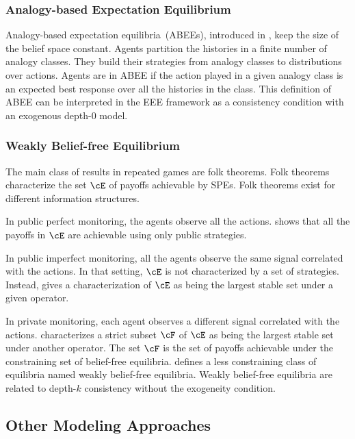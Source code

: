 \subsubsection{Analogy-based Expectation Equilibrium}
Analogy-based expectation equilibria~(ABEEs), introduced in \cite{jehiel:2005}, keep the size of the belief space constant.
Agents partition the histories in a finite number of analogy classes.
They build their strategies from analogy classes to distributions over actions.
Agents are in ABEE if the action played in a given analogy class is an expected best response over all the histories in the class.
This definition of ABEE can be interpreted in the EEE framework as a consistency condition with an exogenous depth-\(0\) model.

\subsubsection{Weakly Belief-free Equilibrium}
The main class of results in repeated games are folk theorems.
Folk theorems characterize the set \(\cE\) of payoffs achievable by SPEs.
Folk theorems exist for different information structures.

In public perfect monitoring, the agents observe all the actions.
\cite{abreu:1988} shows that all the payoffs in \(\cE\) are achievable using only public strategies.

In public imperfect monitoring, all the agents observe the same signal correlated with the actions.
In that setting, \(\cE\) is not characterized by a set of strategies.
Instead, \cite{abreu_pearce_stacchetti:1990} gives a characterization of \(\cE\) as being the largest stable set under a given operator.

In private monitoring, each agent observes a different signal correlated with the actions.
\cite{ely_horner_olszewski:2005} characterizes a strict subset \(\cF\) of \(\cE\) as being the largest stable set under another operator.
The set \(\cF\) is the set of payoffs achievable under the constraining set of belief-free equilibria.
\cite{kandori:2011} defines a less constraining class of equilibria named weakly belief-free equilibria.
Weakly belief-free equilibria are related to depth-\(k\) consistency without the exogeneity condition.

\subsection{Other Modeling Approaches}

